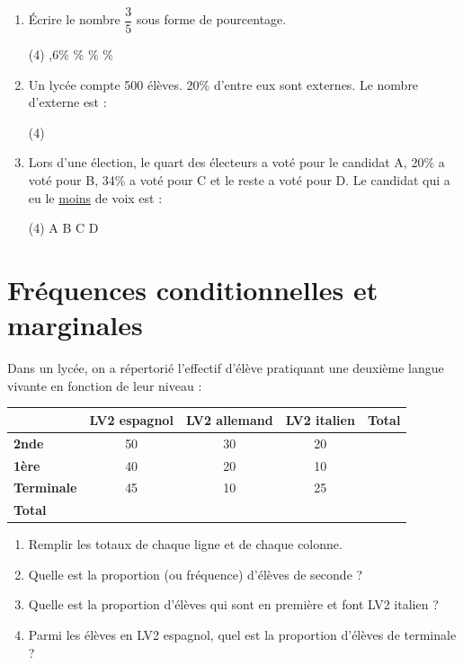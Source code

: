 \documentclass[10pt,a4paper]{article}
\begin{document}
\begin{exo}[QCM][bac]
\begin{enumerate}
    \item Écrire le nombre \(\dfrac{3}{5}\) sous forme de pourcentage.
    \begin{tasks}(4)
        ,6\%
        \%
        \%
        \%
    \end{tasks}
    \item Un lycée compte 500 élèves. 20\% d'entre eux sont externes. Le nombre d'externe est :
    \begin{tasks}(4)
    \end{tasks}
    \item Lors d'une élection, le quart des électeurs a voté pour le candidat A, 20\% a voté pour B, 34\% a voté pour C et le reste a voté pour D. Le candidat qui a eu le \underline{moins} de voix est :\begin{tasks}(4)
        \task A
        \task B
        \task C
        \task D
    \end{tasks}
\end{enumerate}
\end{exo}

\section{Fréquences conditionnelles et marginales}

\begin{exo}[][]
Dans un lycée, on a répertorié l'effectif d'élève pratiquant une deuxième langue vivante en fonction de leur niveau :
\begin{center}
    \renewcommand{\arraystretch}{1.5}
    \begin{tabular}{|l|c|c|c|c|}
        \hline
        & \textbf{LV2 espagnol} & \textbf{LV2 allemand} & \textbf{LV2 italien} & \textbf{Total} \\
        \hline
        \textbf{2nde} & 50 & 30 & 20 &  \\
        \hline
        \textbf{1ère} & 40 & 20 & 10 &  \\
        \hline
        \textbf{Terminale} & 45 & 10 & 25 & \\
        \hline
        \textbf{Total} &  & &  &  \\
        \hline
    \end{tabular}
\end{center}
\begin{enumerate}
    \item Remplir les totaux de chaque ligne et de chaque colonne.
    \medbreak
    \item Quelle est la proportion (ou fréquence) d'élèves de seconde ?
    \item Quelle est la proportion d'élèves qui sont en première et font LV2 italien ?
    \medbreak
    \item Parmi les élèves en LV2 espagnol, quel est la proportion d'élèves de terminale ?
    \medbreak
\end{enumerate}
\end{exo}
\end{document}
